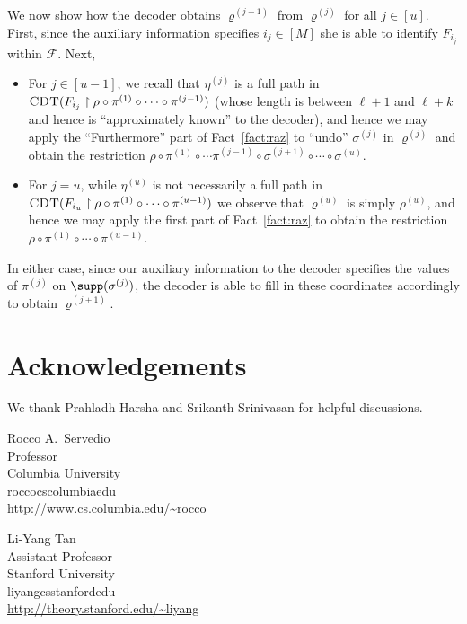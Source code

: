 \documentclass{toc}
\theoremstyle{plain}
\newcommand{\uhr}{\upharpoonright}
\newcommand{\CDT}{\textsc{CDT}}
\begin{document}
We now show how the decoder obtains $\varrho^{(j+1)}$ from $\varrho^{(j)}$ for all $j \in [u]$. First, since the auxiliary information specifies $i_j \in [M]$ she is able to identify $F_{i_j}$ within $\mathscr{F}$. Next, 
\begin{itemize}

\item For $j\in [u-1]$, we recall that $\eta^{(j)}$ is a full path in $\CDT(F_{i_j} \uhr \rho\circ \pi^{(1)} \circ \cdots \circ \pi^{(j-1)})$ (whose length is between $\ell+1$ and $\ell+k$ and hence is ``approximately known'' to the decoder), and hence we may apply the ``Furthermore'' part of Fact~\ref{fact:raz} to ``undo'' $\sigma^{(j)}$ in $\varrho^{(j)}$ and obtain the restriction $\rho \circ \pi^{(1)} \circ \cdots \pi^{(j-1)} \circ \sigma^{(j+1)}\circ \cdots \circ \sigma^{(u)}$.  


\item For $j=u$, while $\eta^{(u)}$ is not necessarily a full path in $\CDT(F_{i_u} \uhr \rho\circ \pi^{(1)}\circ \cdots \circ \pi^{(u-1)})$ we observe that $\varrho^{(u)}$ is simply $\rho^{(u)}$, and hence we may apply the first part of Fact~\ref{fact:raz} to obtain the restriction $\rho\circ\pi^{(1)}\circ\cdots \circ \pi^{(u-1)}$. 
\end{itemize}

In either case, since our auxiliary information to the decoder specifies the values of $\pi^{(j)}$ on $\supp(\sigma^{(j)})$, the decoder is able to fill in these coordinates accordingly to obtain $\varrho^{(j+1)}$. 

\section*{Acknowledgements} 

We thank Prahladh Harsha and Srikanth Srinivasan for helpful discussions.

%

%
%
%
%
%


%
%
%
%
%
\begin{tocauthors}
\begin{tocinfo}[servedio]
 Rocco A.~Servedio\\
 Professor\\
Columbia University\\
 rocco\tocat{}cs\tocdot{}columbia\tocdot{}edu \\   %
 \url{http://www.cs.columbia.edu/~rocco}      %
\end{tocinfo}
\begin{tocinfo}[tan]
Li-Yang Tan\\
Assistant Professor\\
  Stanford University\\
  liyang\tocat{}cs\tocdot{}stanford\tocdot{}edu \\
  \url{http://theory.stanford.edu/~liyang}
\end{tocinfo}
\end{tocauthors}
\end{document}
